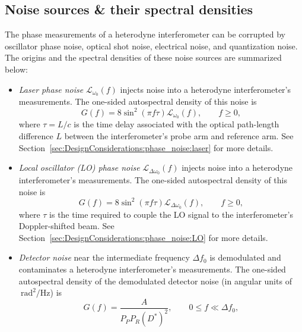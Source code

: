 \subsection{Noise sources \& their spectral densities}
\label{sec:DesignConsiderations:summary:noise}
The phase measurements of a heterodyne interferometer can be corrupted by
oscillator phase noise, optical shot noise, electrical noise, and
quantization noise.
The origins and the spectral densities of these noise sources
are summarized below:
\begin{itemize}
  \item \emph{Laser phase noise}
    $\mathcal{L}_{\omega_0}(f)$
    injects noise into a heterodyne interferometer's measurements.
    The one-sided autospectral density of this noise is
    \begin{equation}
      G(f)
      =
      8 \sin^2(\pi f \tau) \mathcal{L}_{\omega_0}(f),
      \qquad
      f \geq 0,
      \label{eq:DesignConsiderations:summary:laser_phase_noise_autospectral_density}
    \end{equation}
    where $\tau = L / c$ is the time delay
    associated with the optical path-length difference $L$
    between the interferometer's probe arm and reference arm.
    See Section~\ref{sec:DesignConsiderations:phase_noise:laser}
    for more details.
  \item \emph{Local oscillator (LO) phase noise}
    $\mathcal{L}_{\Delta \omega_0}(f)$
    injects noise into a heterodyne interferometer's measurements.
    The one-sided autospectral density of this noise is
    \begin{equation}
      G(f)
      =
      8 \sin^2(\pi f \tau) \mathcal{L}_{\Delta \omega_0}(f),
      \qquad
      f \geq 0,
      \label{eq:DesignConsiderations:summary:LO_phase_noise_autospectral_density}
    \end{equation}
    where $\tau$ is the time required to couple the LO signal
    to the interferometer's Doppler-shifted beam.
    See Section~\ref{sec:DesignConsiderations:phase_noise:LO}
    for more details.
  \item \emph{Detector noise} near the intermediate frequency $\Delta f_0$
    is demodulated and contaminates a heterodyne interferometer's measurements.
    The one-sided autospectral density of the demodulated detector noise
    (in angular units of $\SI{}{\radian\squared\per\Hz}$) is
    \begin{equation}
      G(f)
      =
      \frac{A}{P_P P_R (D^*)^2},
      \qquad
      0 \leq f \ll \Delta f_0,
      \label{eq:DesignConsiderations:summary:detector_noise_autospectral_density}

\end{equation}
\end{itemize}
